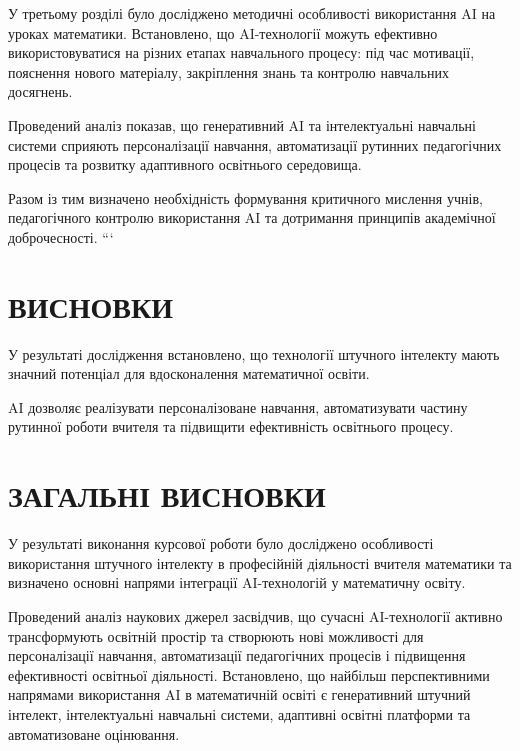 У третьому розділі було досліджено методичні особливості використання AI на уроках математики. Встановлено, що AI-технології можуть ефективно використовуватися на різних етапах навчального процесу: під час мотивації, пояснення нового матеріалу, закріплення знань та контролю навчальних досягнень.

Проведений аналіз показав, що генеративний AI та інтелектуальні навчальні системи сприяють персоналізації навчання, автоматизації рутинних педагогічних процесів та розвитку адаптивного освітнього середовища.

Разом із тим визначено необхідність формування критичного мислення учнів, педагогічного контролю використання AI та дотримання принципів академічної доброчесності.
```



\newpage

\section*{ВИСНОВКИ}

У результаті дослідження встановлено, що технології штучного інтелекту мають значний потенціал для вдосконалення математичної освіти.

AI дозволяє реалізувати персоналізоване навчання, автоматизувати частину рутинної роботи вчителя та підвищити ефективність освітнього процесу.


\section*{ЗАГАЛЬНІ ВИСНОВКИ}


У результаті виконання курсової роботи було досліджено особливості використання штучного інтелекту в професійній діяльності вчителя математики та визначено основні напрями інтеграції AI-технологій у математичну освіту.

Проведений аналіз наукових джерел засвідчив, що сучасні AI-технології активно трансформують освітній простір та створюють нові можливості для персоналізації навчання, автоматизації педагогічних процесів і підвищення ефективності освітньої діяльності. Встановлено, що найбільш перспективними напрямами використання AI в математичній освіті є генеративний штучний інтелект, інтелектуальні навчальні системи, адаптивні освітні платформи та автоматизоване оцінювання.

